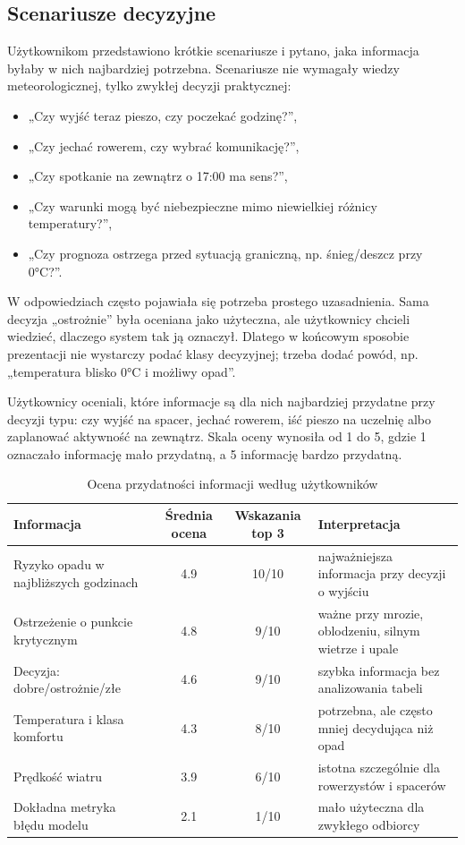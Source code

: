 \documentclass[a4paper,12pt]{article}
\begin{document}
\subsection{Scenariusze decyzyjne}

Użytkownikom przedstawiono krótkie scenariusze i pytano, jaka informacja byłaby
w nich najbardziej potrzebna. Scenariusze nie wymagały wiedzy meteorologicznej,
tylko zwykłej decyzji praktycznej:
\begin{itemize}
    \item „Czy wyjść teraz pieszo, czy poczekać godzinę?”,
    \item „Czy jechać rowerem, czy wybrać komunikację?”,
    \item „Czy spotkanie na zewnątrz o 17:00 ma sens?”,
    \item „Czy warunki mogą być niebezpieczne mimo niewielkiej różnicy temperatury?”,
    \item „Czy prognoza ostrzega przed sytuacją graniczną, np. śnieg/deszcz przy 0°C?”.
\end{itemize}

\noindent
W odpowiedziach często pojawiała się potrzeba prostego uzasadnienia. Sama
decyzja „ostrożnie” była oceniana jako użyteczna, ale użytkownicy chcieli
wiedzieć, dlaczego system tak ją oznaczył. Dlatego w końcowym sposobie
prezentacji nie wystarczy podać klasy decyzyjnej; trzeba dodać powód, np.
„temperatura blisko 0°C i możliwy opad”.

\noindent
Użytkownicy oceniali, które informacje są dla nich najbardziej przydatne przy
decyzji typu: czy wyjść na spacer, jechać rowerem, iść pieszo na uczelnię albo
zaplanować aktywność na zewnątrz. Skala oceny wynosiła od 1 do 5, gdzie 1
oznaczało informację mało przydatną, a 5 informację bardzo przydatną.

\begin{table}[h]
\centering
\caption{Ocena przydatności informacji według użytkowników}
\small
\begin{tabularx}{\textwidth}{p{4.4cm}ccX}
\toprule
Informacja & Średnia ocena & Wskazania top 3 & Interpretacja \\
\midrule
Ryzyko opadu w najbliższych godzinach & 4.9 & 10/10 & najważniejsza informacja przy decyzji o wyjściu \\
Ostrzeżenie o punkcie krytycznym & 4.8 & 9/10 & ważne przy mrozie, oblodzeniu, silnym wietrze i upale \\
Decyzja: dobre/ostrożnie/złe & 4.6 & 9/10 & szybka informacja bez analizowania tabeli \\
Temperatura i klasa komfortu & 4.3 & 8/10 & potrzebna, ale często mniej decydująca niż opad \\
Prędkość wiatru & 3.9 & 6/10 & istotna szczególnie dla rowerzystów i spacerów \\
Dokładna metryka błędu modelu & 2.1 & 1/10 & mało użyteczna dla zwykłego odbiorcy \\
\bottomrule
\end{tabularx}
\normalsize
\end{table}
\end{document}
